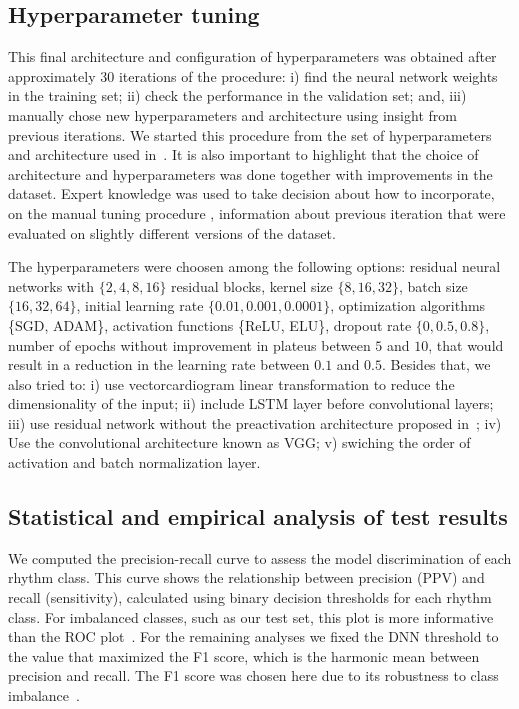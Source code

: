 \documentclass{article}
\begin{document}
\subsection{Hyperparameter tuning}

This final architecture and configuration of hyperparameters was obtained after approximately 30 iterations of the procedure: i) find the neural network weights in the training set; ii) check the performance in the validation set; and, iii) manually chose new hyperparameters and architecture using insight from previous iterations. We started this procedure from the set of hyperparameters and architecture used in~\cite{hannun_cardiologistlevel_2019}. It is also important to highlight that the choice of architecture and hyperparameters was done together with improvements in the dataset. Expert knowledge was used to take decision about how to incorporate, on the manual tuning procedure , information about previous iteration that were evaluated on slightly different versions of the dataset.

The hyperparameters were choosen among the following options: residual neural networks with $\{2, 4, 8, 16\}$ residual blocks, kernel size $\{8, 16, 32\}$, batch size $\{16, 32, 64\}$, initial learning rate $\{0.01, 0.001, 0.0001\}$, optimization algorithms \{SGD, ADAM\}, activation functions \{ReLU, ELU\}, dropout rate $\{0, 0.5, 0.8\}$, number of epochs without improvement in plateus between $5$ and $10$, that would result in a reduction in the learning rate between $0.1$ and $0.5$. Besides that, we also tried to: i) use vectorcardiogram linear transformation to reduce the dimensionality of the input; ii)  include LSTM layer before convolutional layers; iii) use residual network without the preactivation architecture proposed in~\cite{he_identity_2016}; iv) Use the convolutional architecture known as VGG; v) swiching the order of activation and batch normalization layer.


\subsection{Statistical and empirical analysis of test results}

We computed the precision-recall curve to assess the model discrimination of each rhythm class. This curve shows the relationship between precision (PPV) and recall (sensitivity), calculated using binary decision thresholds for each rhythm class. For imbalanced classes, such as our test set, this plot is more informative than the ROC plot~\cite{saito_precisionrecall_2015}. For the remaining analyses we fixed the DNN threshold to the value that maximized the F1 score, which is the harmonic mean between precision and recall. The F1 score was chosen here due to its robustness to class imbalance~\cite{saito_precisionrecall_2015}.
\end{document}
